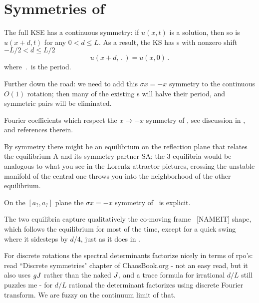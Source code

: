 %

\section{Symmetries of \KSe}

The full KSE has a continuous symmetry: if
$u(x,t)$ is a solution, then so is $u(x+d,t)$ for any
$0 < d \leq L$.  As a result,
the KS has \rpo s with nonzero shift $-L/2 < d \leq L/2$
\[ u(x+d,\period{}) = u(x,0)
\,.
\]
where $\period{}$ is the period. 

Further down the road: we need to add this
$\sigma x = -x$ symmetry
 to the continuous $O(1)$ rotation; then many of the existing \rpo s will
 halve their period, and symmetric pairs will be eliminated.

Fourier coefficients which respect the $x \to -x$ symmetry of
\KSe, see discussion in ,
and references therein.

By symmetry there might be an equilibrium on the reflection plane that
relates the equilibrium A and its symmetry partner SA; the 3 equilibria would
be analogous to what you see in the Lorentz attractor pictures, crossing
the unstable manifold of the central one throws you into the neighborhood
of the other equilibrium.

On the 
	$[a_?,a_?]$ plane
	the $\sigma x = -x$ symmetry of \KSe\ is explicit.

The two equilibria
capture qualitatively the co-moving frame \rpo\ [NAMEIT] shape,
which follows the
equilibrium for most of the time, except for a quick swing where it
sidesteps by $d/4$, just as it does in . 

For discrete rotations the spectral determinants factorize
nicely in terms of rpo's:
read ``Discrete symmetries" chapter of ChaosBook.org - not an easy read, but
it also uses $g{J}$ rather than the naked ${J}$,
and a trace formula for irrational
$d/L$ still puzzles me - for $d/L$ rational the determinant factorizes using
discrete Fourier transform.
We are fuzzy on the continuum limit of that.

